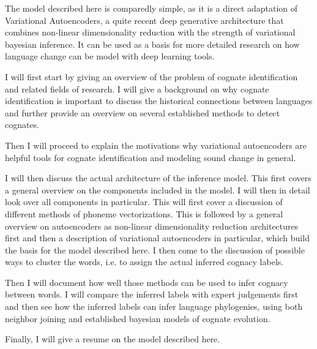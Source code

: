 \documentclass[6pt]{article}
\begin{document}
The model described here is comparedly simple, as it is a direct adaptation of Variational Autoencoders, a quite recent deep generative architecture that combines non-linear dimensionality reduction with the strength of variational bayesian inference. It can be used as a basis for more detailed research on how language change can be model with deep learning tools. 


I will first start by giving an overview of the problem of cognate identification and related fields of research. I will give a background on why cognate identification is important to discuss the historical connections between languages and further provide an overview on several established methods to detect cognates.  

Then I will proceed to explain the motivations why variational autoencoders are helpful tools for cognate identification and modeling sound change in general. 

I will then discuss the actual architecture of the inference model. This first covers a general overview on the components included in the model. I will then in detail look over all components in particular. This will first cover a discussion of different methods of phoneme vectorizations. This is followed by a general overview on autoencoders as non-linear dimensionality reduction architectures first and then a description of variational autoencoders in particular, which build the basis for the model described here. I then come to the discussion of possible ways to cluster the words, i.e. to assign the actual inferred cognacy labels.

Then I will document how well those methods can be used to infer cognacy between words. I will compare the inferred labels with expert judgements first and then see how the inferred labels can infer language phylogenies, using both neighbor joining and established bayesian models of cognate evolution.

Finally, I will give a resume on the model described here.
\end{document}
